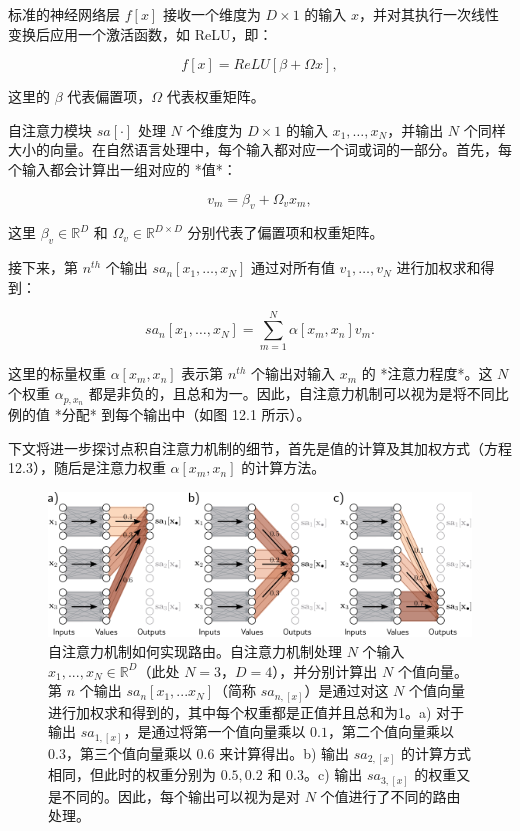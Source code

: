 标准的神经网络层 \(f[x]\) 接收一个维度为 \(D \times 1\) 的输入 \(x\)，并对其执行一次线性变换后应用一个激活函数，如 ReLU，即：

\begin{equation}
f[x] = ReLU[\beta + \Omega x], 
\end{equation}

这里的 \(\beta\) 代表偏置项，\(\Omega\) 代表权重矩阵。

自注意力模块 \(sa[\cdot]\) 处理 \(N\) 个维度为 \(D \times 1\) 的输入 \(x_1, \ldots, x_N\)，并输出 \(N\) 个同样大小的向量。在自然语言处理中，每个输入都对应一个词或词的一部分。首先，每个输入都会计算出一组对应的 *值*：

\begin{equation}
v_m = \beta_v + \Omega_vx_m, 
\end{equation}

这里 \(\beta_v \in \mathbb{R}^D\) 和 \(\Omega_v \in \mathbb{R}^{D \times D}\) 分别代表了偏置项和权重矩阵。

接下来，第 \(n^{th}\) 个输出 \(sa_n[x_1, \ldots, x_N]\) 通过对所有值 \(v_1, \ldots, v_N\) 进行加权求和得到：

\begin{equation}
sa_n[x_1, \ldots, x_N] = \sum_{m=1}^N \alpha[x_m, x_n]v_m. 
\end{equation}

这里的标量权重 \(\alpha[x_m, x_n]\) 表示第 \(n^{th}\) 个输出对输入 \(x_m\) 的 *注意力程度*。这 \(N\) 个权重 \(\alpha_{p, x_n}\) 都是非负的，且总和为一。因此，自注意力机制可以视为是将不同比例的值 *分配* 到每个输出中（如图 12.1 所示）。

下文将进一步探讨点积自注意力机制的细节，首先是值的计算及其加权方式（方程 12.3），随后是注意力权重 \(\alpha[x_m, x_n]\) 的计算方法。

\begin{figure}[ht!]
\centering
\includegraphics[width=0.7\linewidth]{png/chapter12/TransformerRouting.png}
\caption{自注意力机制如何实现路由。自注意力机制处理 \(N\) 个输入 \(x_1, ..., x_N \in \mathbb{R}^D\)（此处 \(N = 3\)，\(D = 4\)），并分别计算出 \(N\) 个值向量。第 \(n\) 个输出 \(sa_n[x_1, ... x_N]\)（简称 \(sa_{n, [x]}\)）是通过对这 \(N\) 个值向量进行加权求和得到的，其中每个权重都是正值并且总和为1。a) 对于输出 \(sa_{1, [x]}\)，是通过将第一个值向量乘以 \(0.1\)，第二个值向量乘以 \(0.3\)，第三个值向量乘以 \(0.6\) 来计算得出。b) 输出 \(sa_{2, [x]}\) 的计算方式相同，但此时的权重分别为 \(0.5, 0.2\) 和 \(0.3\)。c) 输出 \(sa_{3, [x]}\) 的权重又是不同的。因此，每个输出可以视为是对 \(N\) 个值进行了不同的路由处理。}
\end{figure}


